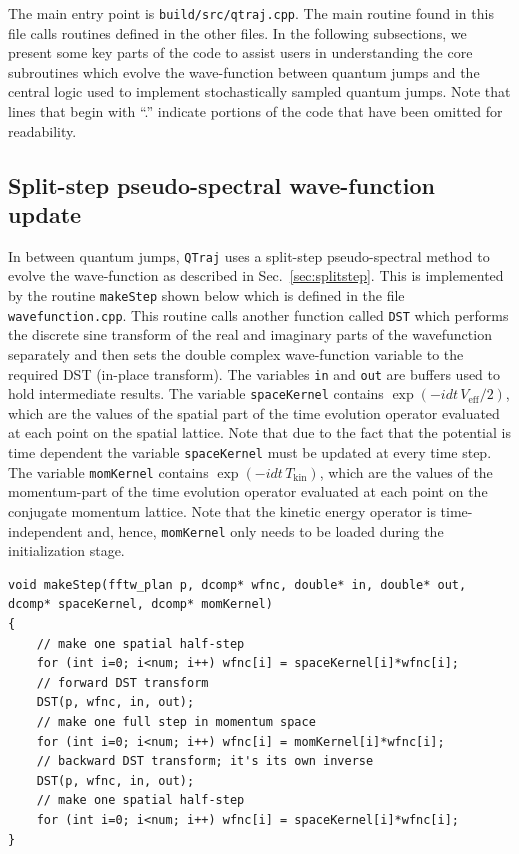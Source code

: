\documentclass[times,sort&compress,final]{elsarticle}
\def\qtraj{{\tt QTraj} }
\begin{document}
The main entry point is {\tt build/src/qtraj.cpp}.  The main routine found in this file calls routines defined in the other files.  In the following subsections, we present some key parts of the code to assist users in understanding the core subroutines which evolve the wave-function between quantum jumps and the central logic used to implement stochastically sampled quantum jumps.  Note that lines that begin with ``.'' indicate portions of the code that have been omitted for readability.

\subsection{Split-step pseudo-spectral wave-function update}

In between quantum jumps, \qtraj uses a split-step pseudo-spectral method to evolve the wave-function as described in Sec.~\ref{sec:splitstep}.  This is implemented by the routine {\tt makeStep} shown below which is defined in the file {\tt wavefunction.cpp}.  This routine calls another function called {\tt DST} which performs the discrete sine transform of the real and imaginary parts of the wavefunction separately and then sets the double complex wave-function variable to the required DST (in-place transform).  The variables {\tt in} and {\tt out} are buffers used to hold intermediate results.  The variable {\tt spaceKernel} contains $\exp(-i dt \, V_\text{eff}  / 2)$, which are the values of the spatial part of the time evolution operator evaluated at each point on the spatial lattice.  Note that due to the fact that the potential is time dependent the variable {\tt spaceKernel} must be updated at every time step.  The variable {\tt momKernel} contains $\exp(-i dt \, T_\text{kin})$, which are the values of the momentum-part of the time evolution operator evaluated at each point on the conjugate momentum lattice.  Note that the kinetic energy operator is time-independent and, hence, {\tt momKernel} only needs to be loaded during the initialization stage.
%
\begin{lstlisting}
void makeStep(fftw_plan p, dcomp* wfnc, double* in, double* out, dcomp* spaceKernel, dcomp* momKernel)
{
    // make one spatial half-step
    for (int i=0; i<num; i++) wfnc[i] = spaceKernel[i]*wfnc[i];
    // forward DST transform
    DST(p, wfnc, in, out);
    // make one full step in momentum space
    for (int i=0; i<num; i++) wfnc[i] = momKernel[i]*wfnc[i];
    // backward DST transform; it's its own inverse
    DST(p, wfnc, in, out);
    // make one spatial half-step
    for (int i=0; i<num; i++) wfnc[i] = spaceKernel[i]*wfnc[i];
}
\end{lstlisting}
\end{document}
